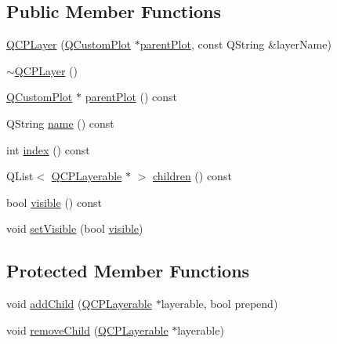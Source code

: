 \subsection*{Public Member Functions}
\begin{DoxyCompactItemize}
\item 
\hyperlink{class_q_c_p_layer_a5d0657fc86d624e5efbe930ef21af718}{Q\+C\+P\+Layer} (\hyperlink{class_q_custom_plot}{Q\+Custom\+Plot} $\ast$\hyperlink{class_q_c_p_layer_a3958c9a938c2d05a7378c41484acee08}{parent\+Plot}, const Q\+String \&layer\+Name)
\item 
\hyperlink{class_q_c_p_layer_afc1a8940f8e34c9f25ead9dfd4828cae}{$\sim$\+Q\+C\+P\+Layer} ()
\item 
\hyperlink{class_q_custom_plot}{Q\+Custom\+Plot} $\ast$ \hyperlink{class_q_c_p_layer_a3958c9a938c2d05a7378c41484acee08}{parent\+Plot} () const 
\item 
Q\+String \hyperlink{class_q_c_p_layer_a96ebd1e436f3813938cb9cd4a59a60be}{name} () const 
\item 
int \hyperlink{class_q_c_p_layer_ad5d7010829a6b99f326b07d7e37c8c99}{index} () const 
\item 
Q\+List$<$ \hyperlink{class_q_c_p_layerable}{Q\+C\+P\+Layerable} $\ast$ $>$ \hyperlink{class_q_c_p_layer_a94c2f0100e48cefad2de8fe0fbb03c27}{children} () const 
\item 
bool \hyperlink{class_q_c_p_layer_a9efca636e4dcad721999a6282f296016}{visible} () const 
\item 
void \hyperlink{class_q_c_p_layer_ac07671f74edf6884b51a82afb2c19516}{set\+Visible} (bool \hyperlink{class_q_c_p_layer_a9efca636e4dcad721999a6282f296016}{visible})
\end{DoxyCompactItemize}
\subsection*{Protected Member Functions}
\begin{DoxyCompactItemize}
\item 
void \hyperlink{class_q_c_p_layer_a57ce5e49364aa9122276d5df3b4a0ddc}{add\+Child} (\hyperlink{class_q_c_p_layerable}{Q\+C\+P\+Layerable} $\ast$layerable, bool prepend)
\item 
void \hyperlink{class_q_c_p_layer_ac2f64ac7761650582d968d86670ef362}{remove\+Child} (\hyperlink{class_q_c_p_layerable}{Q\+C\+P\+Layerable} $\ast$layerable)
\end{DoxyCompactItemize}
